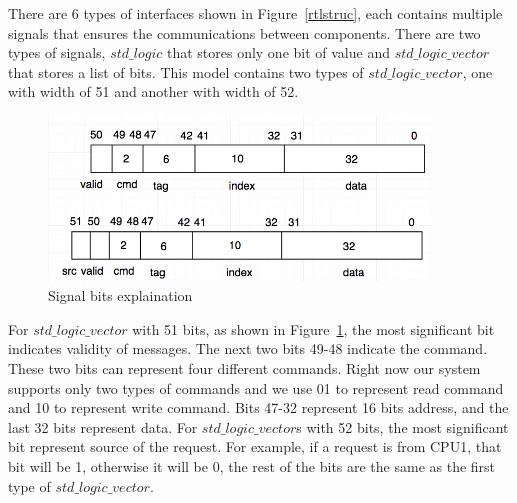 \documentclass[12pt,frontmatter,copyright,thesis]{usfmanus}
\begin{document}
There are 6 types of interfaces shown in Figure~\ref{rtlstruc}, each contains multiple signals
that ensures the communications between components.
There are two types of signals, $std\_logic$ that stores only one bit of value and  $std\_logic\_vector$ that
stores a list of bits. This model contains two types of $std\_logic\_vector$, one with width of 51 and another
with width of 52.
  \begin{figure}[h]
\centerline{
\includegraphics[width=4in]{signalline.png}
}
\caption{Signal bits explaination}
\label{sigline}
\end{figure}
For $std\_logic\_vector$ with 51 bits, as shown in Figure~\ref{sigline},
the most significant bit indicates validity of messages.
The next
two bits 49-48 indicate the command. These two bits can represent four different commands.
Right now our
system supports only two types of commands and
we use 01 to represent read command and 10 to represent write command.
Bits 47-32 represent 16 bits address, and the last 32 bits represent data.
For $std\_logic\_vector$s with 52 bits,
the most significant bit represent source of the request. For example, if a request is from CPU1, that bit
will be 1, otherwise it will be 0, the rest of the bits are the same as the first type of $std\_logic\_vector$.

\end{document}
